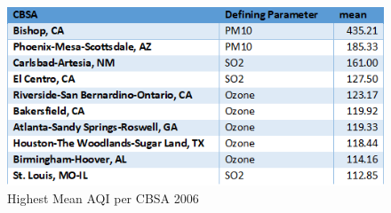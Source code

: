 \documentclass[sigconf]{acmart}
\begin{document}
\begin{figure}[htb]
\includegraphics[width=1.0\columnwidth]{images/top10cbsamean2006.png}
  \caption{Highest Mean AQI per CBSA 2006}
  \label{Highest Mean AQI per CBSA 2006}
\end{figure}



 
\end{document}

